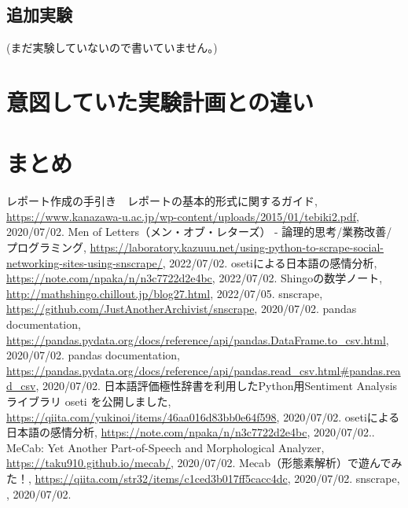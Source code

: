 \documentclass[a4paper, 11pt, titlepage]{jsarticle}
\begin{document}
\subsection{追加実験}
(まだ実験していないので書いていません。)

\section{意図していた実験計画との違い}


\section{まとめ}


\begin{thebibliography}{n}
  レポート作成の手引き　レポートの基本的形式に関するガイド, \url{https://www.kanazawa-u.ac.jp/wp-content/uploads/2015/01/tebiki2.pdf}, 2020/07/02.
   Men of Letters（メン・オブ・レターズ） - 論理的思考/業務改善/プログラミング, \url{https://laboratory.kazuuu.net/using-python-to-scrape-social-networking-sites-using-snscrape/}, 2022/07/02.
    osetiによる日本語の感情分析, \url{https://note.com/npaka/n/n3c7722d2e4bc}, 2022/07/02.
Shingoの数学ノート, \url{http://mathshingo.chillout.jp/blog27.html}, 2022/07/05.
      snscrape, \url{https://github.com/JustAnotherArchivist/snscrape}, 2020/07/02.
      pandas documentation, \url{https://pandas.pydata.org/docs/reference/api/pandas.DataFrame.to_csv.html}, 2020/07/02.
      pandas documentation, \url{https://pandas.pydata.org/docs/reference/api/pandas.read_csv.html#pandas.read_csv}, 2020/07/02.
      日本語評価極性辞書を利用したPython用Sentiment Analysisライブラリ oseti を公開しました, \url{https://qiita.com/yukinoi/items/46aa016d83bb0e64f598}, 2020/07/02.
      osetiによる日本語の感情分析, \url{https://note.com/npaka/n/n3c7722d2e4bc}, 2020/07/02..
      MeCab: Yet Another Part-of-Speech and Morphological Analyzer, \url{https://taku910.github.io/mecab/}, 2020/07/02.
      Mecab（形態素解析）で遊んでみた！, \url{https://qiita.com/str32/items/c1ced3b017ff5cacc4dc}, 2020/07/02.
      \bibitem{}snscrape, \url{}, 2020/07/02.

\end{thebibliography}
\end{document}
